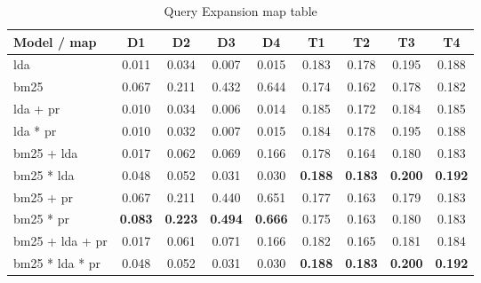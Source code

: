 \begin{table*}[h]
	\centering
	\caption{Query Expansion \gls{map} table}
	\begin{tabular}{l|c|c|c|c|c|c|c|c}
		Model / \gls{map} & D1 & D2 & D3 & D4 & T1 & T2 & T3 & T4 \\
		\midrule
		\gls{lda} & 0.011 & 0.034 & 0.007 & 0.015 & 0.183 & 0.178 & 0.195 & 0.188 \\
		\gls{bm25} & 0.067 & 0.211 & 0.432 & 0.644 & 0.174 & 0.162 & 0.178 & 0.182 \\
		\gls{lda} + \gls{pr} & 0.010 & 0.034 & 0.006 & 0.014 & 0.185 & 0.172 & 0.184 & 0.185 \\
		\gls{lda} * \gls{pr} & 0.010 & 0.032 & 0.007 & 0.015 & 0.184 & 0.178 & 0.195 & 0.188 \\
		\gls{bm25} + \gls{lda} & 0.017 & 0.062 & 0.069 & 0.166 & 0.178 & 0.164 & 0.180 & 0.183 \\
		\gls{bm25} * \gls{lda} & 0.048 & 0.052 & 0.031 & 0.030 & \textbf{0.188} & \textbf{0.183} & \textbf{0.200} & \textbf{0.192} \\
		\gls{bm25} + \gls{pr} & 0.067 & 0.211 & 0.440 & 0.651 & 0.177 & 0.163 & 0.179 & 0.183 \\
		\gls{bm25} * \gls{pr} & \textbf{0.083} & \textbf{0.223} & \textbf{0.494} & \textbf{0.666} & 0.175 & 0.163 & 0.180 & 0.183 \\
		\gls{bm25} + \gls{lda} + \gls{pr} & 0.017 & 0.061 & 0.071 & 0.166 & 0.182 & 0.165 & 0.181 & 0.184 \\
		\gls{bm25} * \gls{lda} * \gls{pr} & 0.048 & 0.052 & 0.031 & 0.030 & \textbf{0.188} & \textbf{0.183} & \textbf{0.200} & \textbf{0.192} \\
	\end{tabular}
	\label{tab:expansion_map}
\end{table*}
